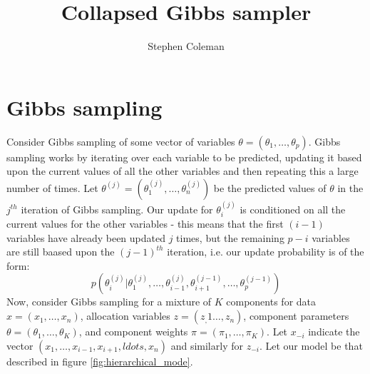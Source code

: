 \documentclass[12pt]{article} %
\title{Collapsed Gibbs sampler}
\author{Stephen Coleman}
\begin{document}
 
	\maketitle
	
	\section{Gibbs sampling}
	
	Consider Gibbs sampling of some vector of variables $\theta=(\theta_1,\ldots,\theta_p)$. Gibbs sampling works by iterating over each variable to be predicted, updating it based upon the current values of all the other variables and then repeating this a large number of times. Let $\theta^{(j)}=(\theta^{(j)}_1,\ldots,\theta^{(j)}_n)$ be the predicted values of $\theta$ in the $j^{th}$ iteration of Gibbs sampling. Our update for $\theta^{(j)}_i$ is conditioned on all the current values for the other variables - this means that the first $(i-1)$ variables have already been updated $j$ times, but the remaining $p - i$ variables are still baased upon the $(j-1)^{th}$ iteration, i.e. our update probability is of the form:
	\[
	p\left(\theta^{(j)}_i | \theta^{(j)}_1,\ldots,\theta^{(j)}_{i-1},\theta^{(j-1)}_{i+1},\ldots, \theta^{(j - 1)}_p\right)
	\]
	Now, consider Gibbs sampling for a mixture of $K$ components for data $x=(x_1, \ldots, x_n)$, allocation variables $z=(z_,1\ldots,z_n)$, component parameters $\theta=(\theta_1,\ldots,\theta_K)$, and component weights $\pi=(\pi_1,\ldots,\pi_K)$. Let $x_{-i}$ indicate the vector $(x_1,\ldots,x_{i-1},x_{i+1},ldots,x_n)$ and similarly for $z_{-i}$. Let our model be that described in figure \ref{fig:hierarchical_mode}.
	
\end{document}
